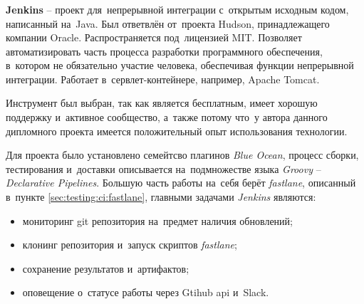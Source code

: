 \subsubsection{}
\label{sec:testing:ci:jenkins}

\textbf{Jenkins} -- проект для~непрерывной интеграции с~открытым исходным кодом, написанный на~Java. Был ответвлён от~проекта Hudson, принадлежащего компании Oracle. Распространяется под~лицензией MIT. Позволяет автоматизировать часть процесса разработки программного обеспечения, в~котором не обязательно участие человека, обеспечивая функции непрерывной интеграции. Работает в~сервлет-контейнере, например, Apache Tomcat\cite{wiki:jenkins}.

Инструмент был выбран, так как является бесплатным, имеет хорошую поддержку и~активное сообщество, а~также потому что~у автора данного дипломного проекта имеется положительный опыт использования технологии.

Для проекта было установлено семейтсво плагинов \textit{Blue Ocean}, процесс сборки, тестирования и~доставки описывается на~подмножестве языка \textit{Groovy} -- \textit{Declarative Pipelines}. Большую часть работы на~себя берёт \textit{fastlane}, описанный в~пункте \ref{sec:testing:ci:fastlane}, главными задачами \textit{Jenkins} являются:

\begin{itemize}
	\item мониторинг git репозитория на~предмет наличия обновлений;
	\item клонинг репозитория и~запуск скриптов \textit{fastlane};
	\item сохранение результатов и~артифактов;
	\item оповещение о~статусе работы через Gtihub \gls{api} и~Slack.
\end{itemize}